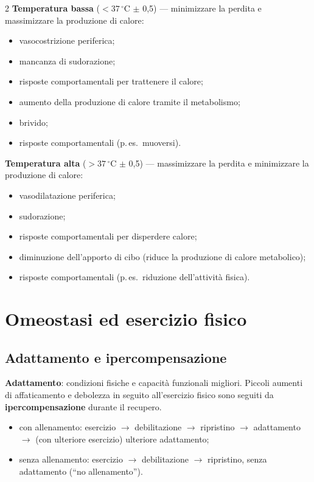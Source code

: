 \begin{multicols}{2}
\textbf{Temperatura bassa} ($< 37\,^\circ$C $\pm$ 0,5) --- minimizzare la perdita e massimizzare la
produzione di calore:
\begin{itemize}
  \item vasocostrizione periferica;
  \item mancanza di sudorazione;
  \item risposte comportamentali per trattenere il calore;
  \item aumento della produzione di calore tramite il metabolismo;
  \item brivido;
  \item risposte comportamentali (p.\,es.\ muoversi).
\end{itemize}

\columnbreak

\textbf{Temperatura alta} ($> 37\,^\circ$C $\pm$ 0,5) --- massimizzare la perdita e minimizzare la
produzione di calore:
\begin{itemize}
  \item vasodilatazione periferica;
  \item sudorazione;
  \item risposte comportamentali per disperdere calore;
  \item diminuzione dell'apporto di cibo (riduce la produzione di calore metabolico);
  \item risposte comportamentali (p.\,es.\ riduzione dell'attività fisica).
\end{itemize}
\end{multicols}

\section{Omeostasi ed esercizio fisico}

\subsection{Adattamento e ipercompensazione}

\textbf{Adattamento}: condizioni fisiche e capacità funzionali migliori. Piccoli aumenti di
affaticamento e debolezza in seguito all'esercizio fisico sono seguiti da \textbf{ipercompensazione}
durante il recupero.
\begin{itemize}
  \item con allenamento: esercizio $\rightarrow$ debilitazione $\rightarrow$ ripristino
    $\rightarrow$ adattamento $\rightarrow$ (con ulteriore esercizio) ulteriore adattamento;
  \item senza allenamento: esercizio $\rightarrow$ debilitazione $\rightarrow$ ripristino, senza
    adattamento (``no allenamento'').
\end{itemize}

